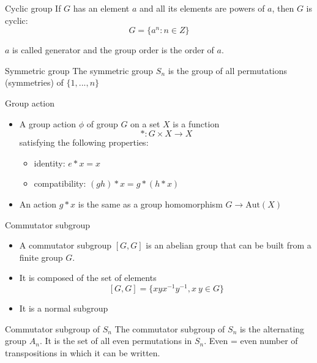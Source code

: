 \documentclass[presentation]{beamer}
\begin{document}
\begin{frame}[label={sec:orgb2981c8}]{Cyclic group}
If \(G\) has an element \(a\) and all its elements are powers of \(a\), then \(G\) is cyclic:
$$G = \{ a^n : n \in Z \}$$

\(a\) is called generator and the group order is the order of \(a\).
\end{frame}

\begin{frame}[label={sec:org12cc864}]{Symmetric group}
The symmetric group \(S_n\) is the group of all permutations (symmetries) of \(\{1, . . . , n\}\)
\end{frame}

\begin{frame}[label={sec:orgb5ba748}]{Group action}
\begin{itemize}
\item A group action \(\phi\) of group \(G\) on a set \(X\) is a function
$$*: G \times X \rightarrow X$$ satisfying the following properties:

\begin{itemize}
\item identity: \(e * x = x\)
\item compatibility: \((gh) * x = g * (h * x)\)
\end{itemize}

\item An action \(g * x\) is the same as a group homomorphism \(G \rightarrow \textrm{Aut}(X)\)
\end{itemize}
\end{frame}

\begin{frame}[label={sec:orgc17273e}]{Commutator subgroup}
\begin{itemize}
\item A commutator subgroup \([G,G]\) is an abelian group that can be built from a
finite group \(G\).

\item It is composed of the set of elements $$[G,G] = \{ xyx^{-1}y^{-1}, x~y \in G \}$$

\item It is a normal subgroup
\end{itemize}
\end{frame}

\begin{frame}[label={sec:org29f3ad1}]{Commutator subgroup of \(S_n\)}
The commutator subgroup of \(S_n\) is the alternating group \(A_n\). It
is the set of all even permutations in \(S_n\). Even = even number of
transpositions in which it can be written.
\end{frame}
\end{document}
